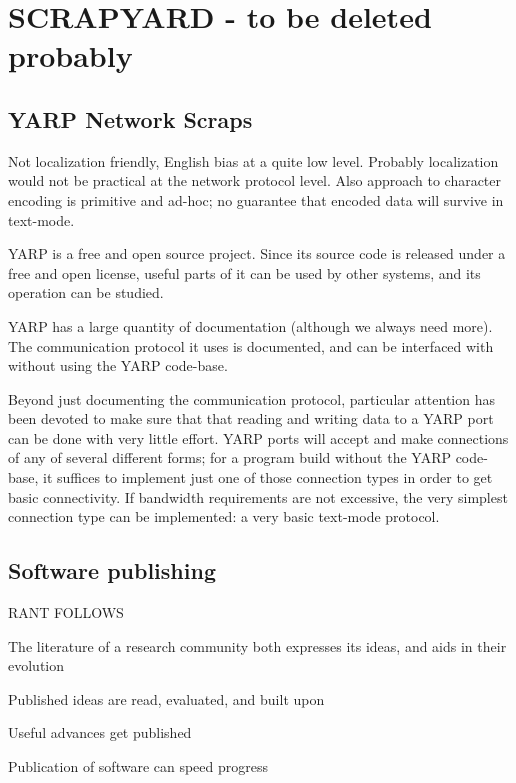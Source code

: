 

\section{SCRAPYARD - to be deleted probably}


\subsection*{YARP Network Scraps}

Not localization friendly, English bias at a quite low level.
Probably localization would not be practical at the network
protocol level.  Also approach to character encoding is
primitive and ad-hoc; no guarantee that encoded data
will survive in text-mode.



YARP is a free and open source project.  Since its source code is
released under a free and open license, useful parts of it can be used
by other systems, and its operation can be studied.

YARP has a large quantity of documentation (although we always need
more).  The communication protocol it uses is documented, and can be
interfaced with without using the YARP code-base.

Beyond just documenting the communication protocol, particular attention
has been devoted to make sure that that reading and writing data to a
YARP port can be done with very little effort.  YARP ports will 
accept and make connections of any of several different forms;
for a program build without the YARP code-base, it suffices
to implement just one of those connection types in order to
get basic connectivity.  If bandwidth requirements are not
excessive, the very simplest connection type can be implemented:
a very basic text-mode protocol.


\subsection*{Software publishing}

RANT FOLLOWS

The literature of a research community both expresses its ideas, and
aids in their evolution

Published ideas are read, evaluated, and built upon

Useful advances get published

Publication of software can speed progress


